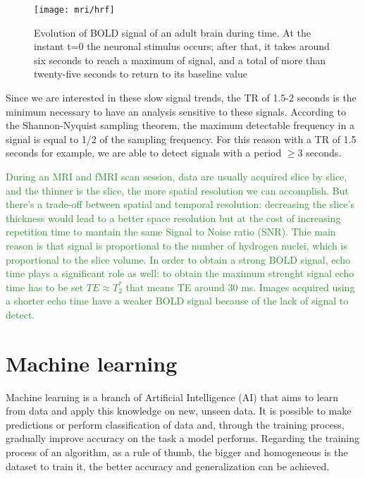 \documentclass[11pt]{report}
\begin{document}
\begin{figure}[h]
\centering
\texttt{[image: mri/hrf]}
\caption{Evolution of BOLD signal of an adult brain during time. At the instant t=0 the neuronal stimulus occurs; after that, it takes around six seconds to reach a maximum of signal, and a total of more than twenty-five seconds to return to its baseline value}
\label{fig:hrf}
\end{figure}


Since we are interested in these slow signal trends, the TR of 1.5-2 seconds is the minimum necessary to have an analysis sensitive to these signals.
According to the Shannon-Nyquist sampling theorem, the maximum detectable frequency in a signal is equal to 1/2 of the sampling frequency.
For this reason with a TR of 1.5 seconds for example, we are able to detect signals with a period $\geq 3$ seconds.

\textcolor{ForestGreen}{During an MRI and fMRI scan session, data are usually acquired slice by slice, and the thinner is the slice, the more spatial resolution we can accomplish.
But there's a trade-off between spatial and temporal resolution: decreasing the slice's thickness would lead to a better space resolution but at the cost of increasing repetition time to mantain the same Signal to Noise ratio (SNR).
Thie main reason is that signal is proportional to the number of hydrogen nuclei, which is proportional to the slice volume.
In order to obtain a strong BOLD signal, echo time plays a significant role as well: to obtain the maximum strenght signal echo time has to be set $TE \approx T_2^{\ast}$ that means TE around 30 ms.
Images acquired using a shorter echo time have a weaker BOLD signal because of the lack of signal to detect. \cite{jenkinson2018}
}


\chapter{Machine learning}\label{chap:machine_learning}

Machine learning is a branch of Artificial Intelligence (AI) that aims to learn from data and apply this knowledge on new, unseen data.
It is possible to make predictions or perform classification of data and, through the training process, gradually improve accuracy on the task a model performs.
Regarding the training process of an algorithm, as a rule of thumb, the bigger and homogeneous is the dataset to train it, the better accuracy and generalization can be achieved. %
\end{document}
